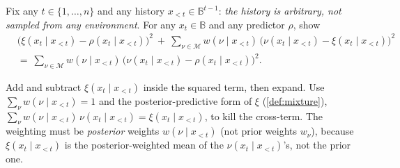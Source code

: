 \documentclass[fontsize=11pt, parskip=half]{scrartcl}
\newcommand{\Mc}{\mathcal{M}}
\begin{document}
\begin{exercise}
\label{prob:sq_pythag}



Fix any $t \in \{1, \dots, n\}$ and any history $x_{<t} \in \mathbb{B}^{t-1}$:
\emph{the history is arbitrary, not sampled from any environment}. For any
$x_t \in \mathbb{B}$ and any predictor $\rho$, show
\begin{align*}
  &\bigl(\xi(x_t \mid x_{<t}) - \rho(x_t \mid x_{<t})\bigr)^{2}
  ~+~
  \sum_{\nu \in \Mc} w(\nu \mid x_{<t})\,\bigl(\nu(x_t \mid x_{<t}) - \xi(x_t \mid x_{<t})\bigr)^{2} \\
  &=~
  \sum_{\nu \in \Mc} w(\nu \mid x_{<t})\,\bigl(\nu(x_t \mid x_{<t}) - \rho(x_t \mid x_{<t})\bigr)^{2}.
\end{align*}

\begin{hint}
Add and subtract $\xi(x_t \mid x_{<t})$ inside the squared term,
then expand. Use $\sum_\nu w(\nu \mid x_{<t}) = 1$ and the posterior-predictive
form of $\xi$ (\cref{def:mixture}), $\sum_\nu w(\nu \mid x_{<t})\,\nu(x_t \mid x_{<t})
= \xi(x_t \mid x_{<t})$, to kill the cross-term. The weighting must be
\emph{posterior} weights $w(\nu \mid x_{<t})$ (not prior weights $w_\nu$),
because $\xi(x_t \mid x_{<t})$ is the posterior-weighted mean of the
$\nu(x_t \mid x_{<t})$'s, not the prior one.
\end{hint}
\end{exercise}
\end{document}
